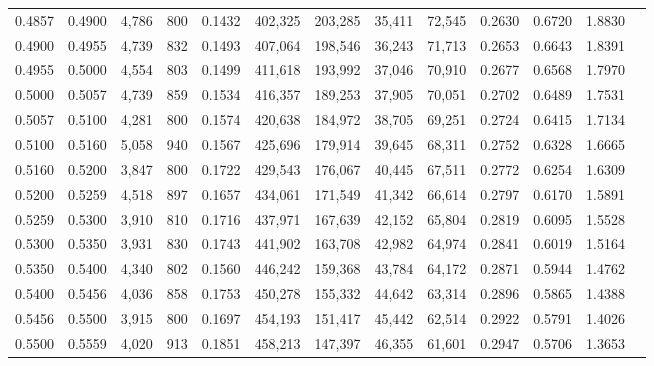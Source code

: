 \begin{tabular}{rrrrrrrrrrrrr}
0.4857 & 0.4900 &  4,786 &   800 &                                     0.1432 & 402,325 & 203,285 &  35,411 &  72,545 & 0.2630 & 0.6720 & 1.8830 \\
0.4900 & 0.4955 &  4,739 &   832 &                                     0.1493 & 407,064 & 198,546 &  36,243 &  71,713 & 0.2653 & 0.6643 & 1.8391 \\
0.4955 & 0.5000 &  4,554 &   803 &                                     0.1499 & 411,618 & 193,992 &  37,046 &  70,910 & 0.2677 & 0.6568 & 1.7970 \\
0.5000 & 0.5057 &  4,739 &   859 &                                     0.1534 & 416,357 & 189,253 &  37,905 &  70,051 & 0.2702 & 0.6489 & 1.7531 \\
0.5057 & 0.5100 &  4,281 &   800 &                                     0.1574 & 420,638 & 184,972 &  38,705 &  69,251 & 0.2724 & 0.6415 & 1.7134 \\
0.5100 & 0.5160 &  5,058 &   940 &                                     0.1567 & 425,696 & 179,914 &  39,645 &  68,311 & 0.2752 & 0.6328 & 1.6665 \\
0.5160 & 0.5200 &  3,847 &   800 &                                     0.1722 & 429,543 & 176,067 &  40,445 &  67,511 & 0.2772 & 0.6254 & 1.6309 \\
0.5200 & 0.5259 &  4,518 &   897 &                                     0.1657 & 434,061 & 171,549 &  41,342 &  66,614 & 0.2797 & 0.6170 & 1.5891 \\
0.5259 & 0.5300 &  3,910 &   810 &                                     0.1716 & 437,971 & 167,639 &  42,152 &  65,804 & 0.2819 & 0.6095 & 1.5528 \\
0.5300 & 0.5350 &  3,931 &   830 &                                     0.1743 & 441,902 & 163,708 &  42,982 &  64,974 & 0.2841 & 0.6019 & 1.5164 \\
0.5350 & 0.5400 &  4,340 &   802 &                                     0.1560 & 446,242 & 159,368 &  43,784 &  64,172 & 0.2871 & 0.5944 & 1.4762 \\
0.5400 & 0.5456 &  4,036 &   858 &                                     0.1753 & 450,278 & 155,332 &  44,642 &  63,314 & 0.2896 & 0.5865 & 1.4388 \\
0.5456 & 0.5500 &  3,915 &   800 &                                     0.1697 & 454,193 & 151,417 &  45,442 &  62,514 & 0.2922 & 0.5791 & 1.4026 \\
0.5500 & 0.5559 &  4,020 &   913 &                                     0.1851 & 458,213 & 147,397 &  46,355 &  61,601 & 0.2947 & 0.5706 & 1.3653 \\

\end{tabular}
